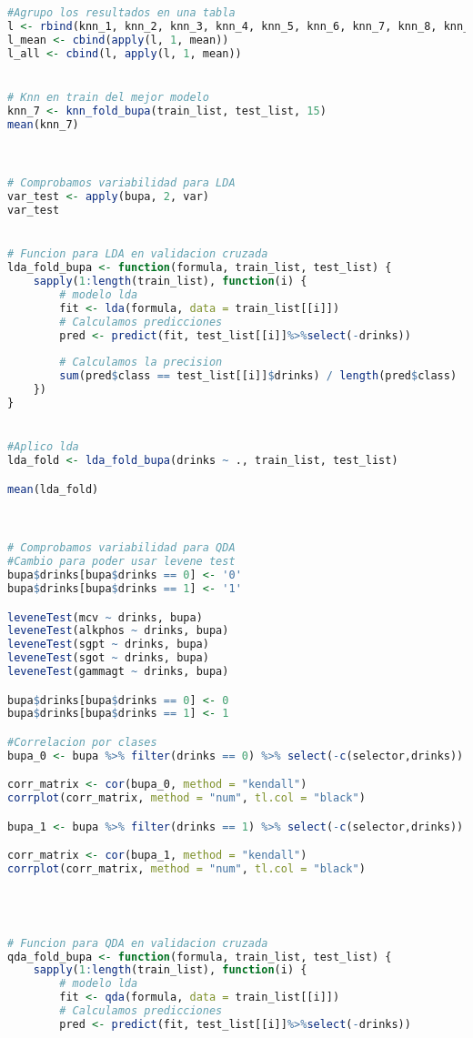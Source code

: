 \begin{lstlisting}[language=R]
#Agrupo los resultados en una tabla
l <- rbind(knn_1, knn_2, knn_3, knn_4, knn_5, knn_6, knn_7, knn_8, knn_9, knn_10)
l_mean <- cbind(apply(l, 1, mean))
l_all <- cbind(l, apply(l, 1, mean))


# Knn en train del mejor modelo
knn_7 <- knn_fold_bupa(train_list, test_list, 15)
mean(knn_7)



# Comprobamos variabilidad para LDA
var_test <- apply(bupa, 2, var)
var_test


# Funcion para LDA en validacion cruzada
lda_fold_bupa <- function(formula, train_list, test_list) {
	sapply(1:length(train_list), function(i) {
		# modelo lda
		fit <- lda(formula, data = train_list[[i]])
		# Calculamos predicciones
		pred <- predict(fit, test_list[[i]]%>%select(-drinks))
		
		# Calculamos la precision
		sum(pred$class == test_list[[i]]$drinks) / length(pred$class)
	})
}


#Aplico lda
lda_fold <- lda_fold_bupa(drinks ~ ., train_list, test_list)

mean(lda_fold)



# Comprobamos variabilidad para QDA
#Cambio para poder usar levene test
bupa$drinks[bupa$drinks == 0] <- '0'
bupa$drinks[bupa$drinks == 1] <- '1'

leveneTest(mcv ~ drinks, bupa)
leveneTest(alkphos ~ drinks, bupa)
leveneTest(sgpt ~ drinks, bupa)
leveneTest(sgot ~ drinks, bupa)
leveneTest(gammagt ~ drinks, bupa)

bupa$drinks[bupa$drinks == 0] <- 0
bupa$drinks[bupa$drinks == 1] <- 1

#Correlacion por clases
bupa_0 <- bupa %>% filter(drinks == 0) %>% select(-c(selector,drinks))

corr_matrix <- cor(bupa_0, method = "kendall")
corrplot(corr_matrix, method = "num", tl.col = "black")

bupa_1 <- bupa %>% filter(drinks == 1) %>% select(-c(selector,drinks))

corr_matrix <- cor(bupa_1, method = "kendall")
corrplot(corr_matrix, method = "num", tl.col = "black")




# Funcion para QDA en validacion cruzada
qda_fold_bupa <- function(formula, train_list, test_list) {
	sapply(1:length(train_list), function(i) {
		# modelo lda
		fit <- qda(formula, data = train_list[[i]])
		# Calculamos predicciones
		pred <- predict(fit, test_list[[i]]%>%select(-drinks))
		

\end{lstlisting}
